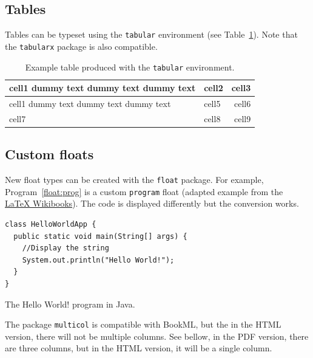\lipsum[1-2]


\subsection{Tables}
\label{float:tab}

Tables can be typeset using the \texttt{tabular} environment (see Table~\ref{tab:tabular}). Note that the \texttt{tabularx} package is also compatible.

\begin{table}
    \centering
    \begin{tabular}{| l | l | r |} 
      \hline
      cell1 dummy text dummy text dummy text & cell2 & cell3 \\ 
      \hline
      cell1 dummy text dummy text dummy text & cell5 & cell6 \\ 
      \hline
      cell7 & cell8 & cell9 \\ 
      \hline
    \end{tabular}

    \caption{Example table produced with the \texttt{tabular} environment.}
    \label{tab:tabular}
\end{table}


\subsection{Custom floats}
\label{float:custom}

New float types can be created with the \texttt{float} package. For example, Program~\ref{float:prog} is a custom \texttt{program} float (adapted example from the \href{https://en.wikibooks.org/wiki/LaTeX/Floats,_Figures_and_Captions}{LaTeX Wikibooks}). The code is displayed differently but the conversion works.

\begin{program}
  \begin{verbatim}
class HelloWorldApp {
  public static void main(String[] args) {
    //Display the string
    System.out.println("Hello World!");
  }
}
\end{verbatim}
  \caption{The Hello World! program in Java.}
  \label{float:prog}
\end{program}


The package \texttt{multicol} is compatible with BookML, but the in the HTML version, there will not be multiple columns. See bellow, in the PDF version, there are three columns, but in the HTML version, it will be a single column.
\begin{multicols}{3}
     \lipsum[1-2]
\end{multicols}

